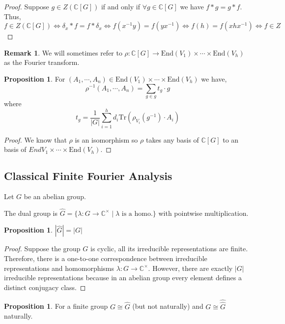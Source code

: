 \documentclass[12pt]{extarticle}
\newcommand{\C}{\mathbb{C}}
\newcommand{\End}[1]{\text{End}\left( #1 \right)}
\newcommand{\tr}[1]{\mathrm{Tr} \! \left(#1\right)}
\theoremstyle{definition}
\newtheorem{proposition}[theorem]{Proposition}
\newtheorem{remark}{Remark}
\newenvironment{definition}[1][Definition:]{\begin{trivlist}
\item[\hskip \labelsep {\bfseries #1}]}{\end{trivlist}}
\begin{document}
\begin{proof}
Suppose $g \in Z(\C[G])$ if and only if $\forall g \in \C[G]$ we have $f * g = g * f$. Thus,
\[ f \in Z(\C[G]) \iff \delta_x * f = f * \delta_x \iff f(x^{-1} y) = f(y x^{-1}) \iff f(h) = f(x h x^{-1}) \iff f \in Z\]
\end{proof}

\begin{remark}
We will sometimes refer to $\rho : \C[G] \to \End{V_1} \times \cdots \times \End{V_h}$ as the Fourier transform. 
\end{remark}

\begin{proposition}
For $(A_1, \cdots, A_n) \in \End{V_1} \times \cdots \times \End{V_h}$ we have,
\[ \rho^{-1}(A_1, \cdots, A_n) = \sum_{g \in g} t_g \cdot g \]
where 
\[ t_g = \frac{1}{|G|} \sum_{i = 1}^h d_i \tr{\rho_{V_i} (g^{-1}) \cdot A_i } \]
\end{proposition}

\begin{proof}
We know that $\rho$ is an isomorphism so $\rho$ takes any basis of $\C[G]$ to an basis of $End{V_1} \times \cdots \times \End{V_h}$.
\end{proof}


\subsection*{Classical Finite Fourier Analysis}

Let $G$ be an abelian group.

\begin{definition}
The dual group is $\hat{G} = \{\lambda : G \to \C^\times \mid \lambda \text{ is a homo.} \}$ with pointwise multiplication. 
\end{definition}

\begin{proposition}
$|\hat{G}| = |G|$
\end{proposition}

\begin{proof}
Suppose the group $G$ is cyclic, all its irreducible representations are finite. Therefore, there is a one-to-one correspondence between irreducible representations and homomorphisms $\lambda : G \to \C^\times$. However, there are exactly $|G|$ irreducible representations because in an abelian group every element defines a distinct conjugacy class.
\end{proof}

\begin{proposition}
For a finite group $G \cong \hat{G}$ (but not naturally) and $G \cong \hat{\hat{G}}$ naturally.
\end{proposition}
\end{document}
